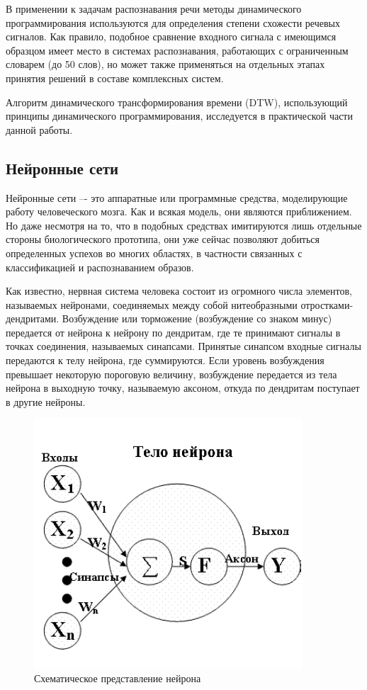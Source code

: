 \documentclass[a4paper,14pt,russian,utf8,nocolumnsxix,nocolumnxxxi,nocolumnxxxii]{eskdtext}
\begin{document}
В применении к задачам распознавания речи методы динамического программирования используются для определения степени схожести речевых сигналов. Как правило, подобное сравнение входного сигнала с имеющимся образцом имеет место в системах распознавания, работающих с ограниченным словарем (до 50 слов), но может также применяться на отдельных этапах принятия решений в составе комплексных систем.

Алгоритм динамического трансформирования времени (DTW), использующий принципы динамического программирования, исследуется в практической части данной работы.

\subsection{Нейронные сети}
Нейронные сети –- это аппаратные или программные средства, моделирующие работу человеческого мозга. Как и всякая модель, они являются приближением. Но даже несмотря на то, что в подобных средствах имитируются лишь отдельные стороны биологического прототипа, они уже сейчас позволяют добиться определенных успехов во многих областях, в частности связанных с классификацией и распознаванием образов.

Как известно, нервная система человека состоит из огромного числа элементов, называемых нейронами, соединяемых между собой нитеобразными отрост\-ками-дендритами. Возбуждение или торможение (возбуждение со знаком минус) передается от нейрона к нейрону по дендритам, где те принимают сигналы в точках соединения, называемых синапсами. Принятые синапсом входные сигналы передаются к телу нейрона, где суммируются. Если уровень возбуждения превышает некоторую пороговую величину, возбуждение передается из тела нейрона в выходную точку, называемую аксоном, откуда по дендритам поступает в другие нейроны.

\begin{figure}[h!]
	\centering
	\includegraphics[width=100mm]{neuro.png}
	\caption{Схематическое представление нейрона}
	\label{neuro}
\end{figure}
\end{document}
